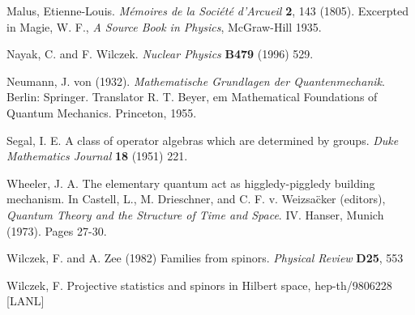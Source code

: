 \documentclass[a4paper,11pt]{article}
\begin{document}
\begin{thebibliography}{XXX}
 Malus, Etienne-Louis. 
{\em M\'emoires de la Soci\'et\'e d'Arcueil} {\bf 2}, 143 (1805).
Excerpted in Magie, W. F., {\em A Source Book in Physics},
McGraw-Hill 1935.


Nayak, C.  and F. Wilczek. {\it Nuclear Physics}  {\bf B479} 
(1996) 529.

Neumann, J. von (1932). 
 {\it Mathematische Grundlagen der
Quanten\-mechanik}. Berlin: Springer. Translator R. T. Beyer, 
{em Mathematical Foundations of Quantum Mechanics}\/. Princeton, 1955.

Segal, I. E.  A class of operator algebras which
are determined by groups. {\it Duke Mathematics Journal} {\bf 18} (1951) 221.

Wheeler, J. A. 
The elementary quantum act as higgledy-piggledy building mechanism. 
In Castell, L., M. Drieschner, and C. F. v. Weizsa\"cker (editors),
{\em Quantum Theory and the Structure of Time and Space}\/. IV. 
Hanser, Munich (1973). Pages 27-30.

Wilczek, F. and A. Zee (1982) Families from spinors.
{\em Physical Review} {\bf D25}, 553

Wilczek, F. Projective statistics and spinors in
 Hilbert space, hep-th/9806228 [LANL]

\end{thebibliography}
\end{document}
